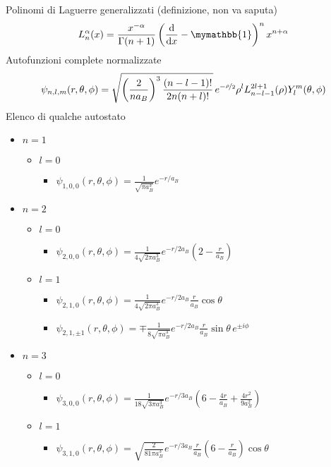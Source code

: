 \documentclass{article}
\newcommand{\deh}{\mathrm{d}}
\newcommand{\dsone}{\mymathbb{1}}
\newcommand{\der}[2][1]{\if 1#1 \frac{\deh}{\deh #2} \else \frac{\deh^#1}{\deh #2^#1} \fi}
\begin{document}
Polinomi di Laguerre generalizzati (definizione, non va saputa)
\[L_n^\alpha(x)=\frac{x^{-\alpha}}{\Gamma(n+1)}\left(\der{x} -\dsone\right)^n x^{n+\alpha}\]
Autofunzioni complete normalizzate
\[\psi_{n,l,m}(r,\theta,\phi)=\sqrt{\left(\frac{2}{na_B}\right)^3\frac{(n-l-1)!}{2n(n+l)!}}\,e^{-\nicefrac{\rho}{2}}\rho^l L_{n-l-1}^{2l+1}(\rho)Y_l^m(\theta,\phi)\]
Elenco di qualche autostato
\begin{itemize}
    \item $n=1$
    \begin{itemize}
        \item $l=0$
        \begin{itemize}
            \item[] $\psi_{1,0,0}(r,\theta,\phi)=\frac{1}{\sqrt{\pi a_B^3}}e^{-r/a_B}$ 
        \end{itemize}
    \end{itemize}
    \item $n=2$
    \begin{itemize}
        \item $l=0$
        \begin{itemize}
            \item[] $\psi_{2,0,0}(r,\theta,\phi)=\frac{1}{4\sqrt{2\pi a_B^3}}e^{-r/2a_B}\left(2-\frac{r}{a_B}\right)$ 
        \end{itemize}
        \item $l=1$
        \begin{itemize}
            \item[] $\psi_{2,1,0}(r,\theta,\phi)=\frac{1}{4\sqrt{2\pi a_B^3}}e^{-r/2a_B}\frac{r}{a_B}\cos\theta$
            \item[] $\psi_{2,1,\pm1}(r,\theta,\phi)=\mp \frac{1}{8\sqrt{\pi a_B^3}}e^{-r/2a_B}\frac{r}{a_B}\sin\theta \,e^{\pm i \phi}$ 
        \end{itemize}
    \end{itemize}
    \item $n=3$
    \begin{itemize}
        \item $l=0$
        \begin{itemize}
            \item[] $\psi_{3,0,0}(r,\theta,\phi)=\frac{1}{18\sqrt{3\pi a_B^3}}e^{-r/3a_B}\left(6-\frac{4r}{a_B}+\frac{4r^2}{9a_B^2}\right)$ 
        \end{itemize}
        \item $l=1$
        \begin{itemize}
            \item[] $\psi_{3,1,0}(r,\theta,\phi)=\sqrt{\frac{2}{81\pi a_B^3}}e^{-r/3a_B}\frac{r}{a_B}\left(6-\frac{r}{a_B}\right)\cos\theta$

\end{itemize}
\end{itemize}
\end{itemize}
\end{document}
